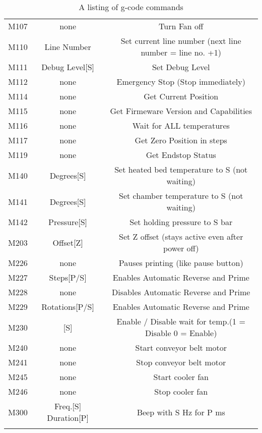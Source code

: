 \begin{landscape}
\begin{longtable}{c|c|c}
  M107	& none & Turn Fan off \\ 
  M110	& Line Number & Set current line number (next line number = line no. +1) \\
  M111	& Debug Level[S] & Set Debug Level \\ 
  M112	& none & Emergency Stop (Stop immediately) \\
  M114 	& none & Get Current Position \\
  M115	& none & Get Firmeware Version and Capabilities \\
  M116	& none & Wait for ALL temperatures \\
  M117	& none & Get Zero Position in steps \\
  M119	& none & Get Endstop Status \\ 
  M140	& Degrees[S]	& Set heated bed temperature to S (not waiting) \\
  M141	& Degrees[S]	& Set chamber temperature to S (not waiting) \\
  M142 	& Pressure[S]	& Set holding pressure to S bar \\
  M203	& Offset[Z]	& Set Z offset (stays active even after power off) \\
  M226	& none	& Pauses printing (like pause button) \\
  M227	& Steps[P/S] & Enables Automatic Reverse and Prime \\
  M228	& none 	& Disables Automatic Reverse and Prime \\
  M229	& Rotations[P/S] & Enables Automatic Reverse and Prime \\
  M230	& [S] & Enable / Disable wait for temp.(1 = Disable 0 = Enable) \\ 
  M240	& none & Start conveyor belt motor \\
  M241	& none & Stop conveyor belt motor \\
  M245	& none & Start cooler fan \\
  M246	& none & Stop cooler fan \\
  M300	& Freq.[S] Duration[P] & Beep with S Hz for P ms \\
  \hline \hline 
\caption{A listing of g-code commands}
\end{longtable}
\end{landscape}
